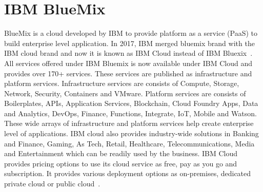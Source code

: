 \section{IBM BlueMix}
BlueMix is a cloud developed by IBM to provide platform as a service
(PaaS) to build enterprise level application. In 2017, IBM merged
bluemix brand with the IBM cloud brand and now it is known as IBM
Cloud instead of IBM Bluexix~\cite{hid-sp18-402-www-ibm-blog}. All
services offered under IBM Bluemix is now available under IBM Cloud
and provides over 170+ services. These services are published as
infrastructure and platform services. Infrastructure services are
consists of Compute, Storage, Network, Security, Containers and
VMware. Platform services are consists of Boilerplates, APIs,
Application Services, Blockchain, Cloud Foundry Apps, Data and
Analytics, DevOps, Finance, Functions, Integrate, IoT, Mobile and
Watson. These wide arrays of infrastructure and platform services help
create enterprise level of applications. IBM cloud also provides
industry-wide solutions in Banking and Finance, Gaming, As Tech,
Retail, Healthcare, Telecommunications, Media and Entertainment which
can be readily used by the business. IBM Cloud provides pricing
options to use its cloud service as free, pay as you go and
subscription. It provides various deployment options as on-premises,
dedicated private cloud or public cloud~\cite{hid-sp18-402-www-ibm}.
